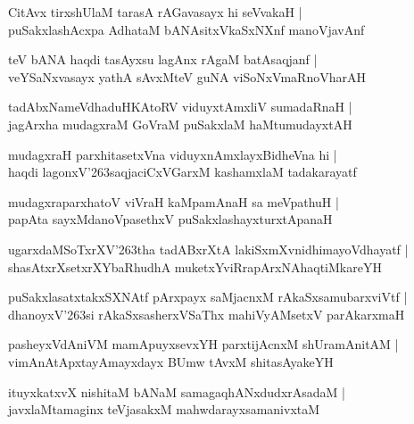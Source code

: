 \documentclass[twoside,12pt,openright]{book}
\def\S{\char'263}
\newcounter{shloka}[chapter]
\begin{document}
\begin{shloka}%
CitAvx tirxshUlaM tarasA rAGavasayx hi seVvakaH |\\
puSakxlashAcxpa AdhataM bANAsitxVkaSxNXnf manoVjavAnf 
\end{shloka}

\begin{shloka}%
teV bANA haqdi tasAyxsu lagAnx rAgaM batAsaqjanf |\\
veYSaNxvasayx yathA sAvxMteV guNA viSoNxVmaRnoVharAH 
\end{shloka}

\begin{shloka}%
tadAbxNameVdhaduHKAtoRV viduyxtAmxliV sumadaRnaH |\\
jagArxha mudagxraM GoVraM puSakxlaM haMtumudayxtAH 
\end{shloka}

\begin{shloka}%
mudagxraH parxhitasetxVna viduyxnAmxlayxBidheVna hi |\\
haqdi lagonxV\S saqjaciCxVGarxM kashamxlaM tadakarayatf
\end{shloka}

\begin{shloka}%
mudagxraparxhatoV viVraH kaMpamAnaH sa meVpathuH |\\
papAta sayxMdanoVpasethxV  puSakxlashayxturxtApanaH 
\end{shloka}

\begin{shloka}%
ugarxdaMSoTxrXV\S tha tadABxrXtA lakiSxmXvnidhimayoVdhayatf |\\
shasAtxrXsetxrXYbaRhudhA muketxYviRrapArxNAhaqtiMkareYH 
\end{shloka}

\begin{shloka}%
puSakxlasatxtakxSXNAtf pArxpayx saMjacnxM rAkaSxsamubarxviVtf |\\
dhanoyxV\S si rAkaSxsasherxVSaThx mahiVyAMsetxV parAkarxmaH 
\end{shloka}

\begin{shloka}%
pasheyxVdAniVM mamApuyxsevxYH parxtijAcnxM shUramAnitAM |\\
vimAnAtApxtayAmayxdayx BUmw tAvxM shitasAyakeYH
\end{shloka}

\begin{shloka}%
ituyxkatxvX nishitaM bANaM samagaqhANxdudxrAsadaM |\\
javxlaMtamaginx teVjasakxM mahwdarayxsamanivxtaM 
\end{shloka}
\end{document}
